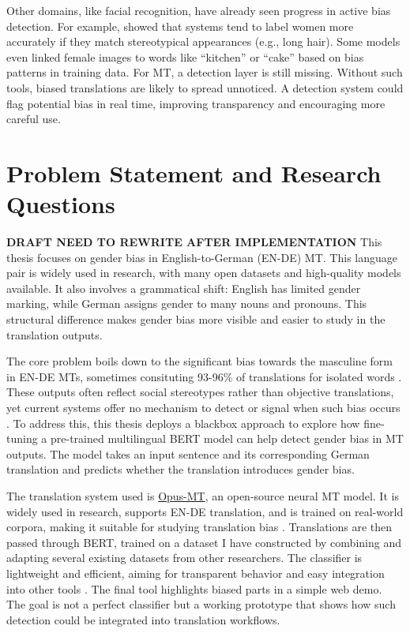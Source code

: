 Other domains, like facial recognition, have already seen progress in active bias detection. For example, \citet{schwemmerDiagnosingGenderBias2020} showed that systems tend to label women more accurately if they match stereotypical appearances (e.g., long hair). Some models even linked female images to words like “kitchen” or “cake” based on bias patterns in training data. For MT, a detection layer is still missing. Without such tools, biased translations are likely to spread unnoticed. A detection system could flag potential bias in real time, improving transparency and encouraging more careful use.

\section{Problem Statement and Research Questions}
\textbf{DRAFT NEED TO REWRITE AFTER IMPLEMENTATION}
This thesis focuses on gender bias in English-to-German (EN-DE) MT. This language pair is widely used in research, with many open datasets and high-quality models available. It also involves a grammatical shift: English has limited gender marking, while German assigns gender to many nouns and pronouns. This structural difference makes gender bias more visible and easier to study in the translation outputs.

The core problem boils down to the significant bias towards the masculine form in EN-DE MTs, sometimes consituting 93-96\% of translations for isolated words \citep{lardelliBuildingBridgesDataset2024}. These outputs often reflect social stereotypes rather than objective translations, yet current systems offer no mechanism to detect or signal when such bias occurs \citep{rescignoGenderBiasMachine2023}. To address this, this thesis deploys a blackbox approach to explore how fine-tuning a pre-trained multilingual BERT model can help detect gender bias in MT outputs. The model takes an input sentence and its corresponding German translation and predicts whether the translation introduces gender bias. 

The translation system used is \href{https://github.com/Helsinki-NLP/Opus-MT?tab=readme-ov-file}{Opus-MT}, an open-source neural MT model. It is widely used in research, supports EN-DE translation, and is trained on real-world corpora, making it suitable for studying translation bias \citep{tiedemannOPUSMTBuildingOpen2020}. Translations are then passed through BERT, trained on a dataset I have constructed by combining and adapting several existing datasets from other researchers. The classifier is lightweight and efficient, aiming for transparent behavior and easy integration into other tools \citep{devlinBERTPretrainingDeep2019}. The final tool highlights biased parts in a simple web demo. The goal is not a perfect classifier but a working prototype that shows how such detection could be integrated into translation workflows.

